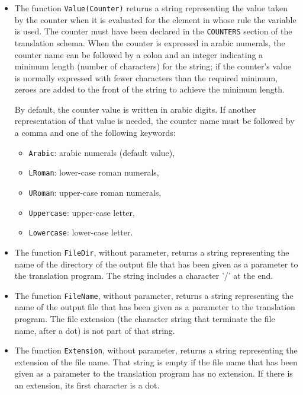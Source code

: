 \begin{itemize}
\item
The function {\tt Value(Counter)} returns a string representing the
value taken by the counter when it is evaluated for the element in
whose rule the variable is used.  The counter must have been declared
in the {\tt COUNTERS} section of the translation schema.  When the
counter is expressed in arabic numerals, the counter
name can be followed by a colon and an integer indicating a minimum
length (number of characters) for the string; if the counter's value
is normally expressed with fewer characters than the required minimum,
zeroes are added to the front of the string to achieve the minimum
length.

By default, the counter value is written in arabic digits.  If another
representation of that value is needed, the counter name must be followed
by a comma and one of the following keywords:
  \begin{itemize}
  \item
  {\tt Arabic}: arabic numerals (default value),
  \item
  {\tt LRoman}: lower-case roman numerals,
  \item
  {\tt URoman}: upper-case roman numerals,
  \item
  {\tt Uppercase}: upper-case letter,
  \item
  {\tt Lowercase}: lower-case letter.
  \end{itemize}

\item
The function {\tt FileDir}, without parameter, returns a string
representing the name of the directory of the output file that has been
given as a parameter to the translation program. The string includes
a character '/' at the end.

\item
The function {\tt FileName}, without parameter, returns a string
representing the name of the output file that has been given as a
parameter to the translation program. The file extension (the character
string that terminate the file name, after a dot) is not part of
that string.

\item
The function {\tt Extension}, without parameter, returns a string
representing the extension of the file name. That string is empty
if the file name that has been given as a parameter to the translation
program has no extension. If there is an extension, its first
character is a dot.


\end{itemize}
